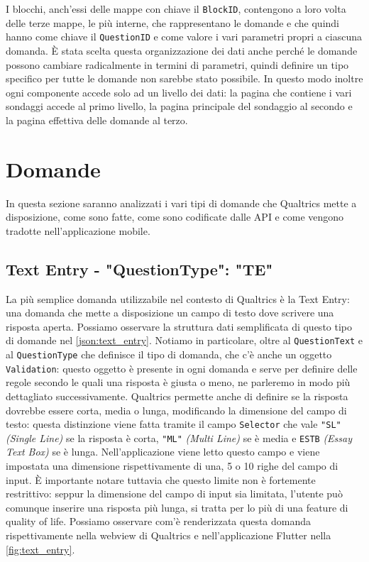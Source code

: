 I blocchi, anch'essi delle mappe con chiave il \texttt{BlockID}, contengono a loro volta delle terze mappe, le più interne, che rappresentano le domande e che quindi hanno come chiave il \texttt{QuestionID} e come valore i vari parametri propri a ciascuna domanda.
È stata scelta questa organizzazione dei dati anche perché le domande possono cambiare radicalmente in termini di parametri, quindi definire un tipo specifico per tutte le domande non sarebbe stato possibile. In questo modo inoltre ogni componente accede solo ad un livello dei dati: la pagina che contiene i vari sondaggi accede al primo livello, la pagina principale del sondaggio al secondo e la pagina effettiva delle domande al terzo.

\section{Domande}
In questa sezione saranno analizzati i vari tipi di domande che Qualtrics mette a disposizione, come sono fatte, come sono codificate dalle API e come vengono tradotte nell'applicazione mobile.

\subsection{Text Entry - "QuestionType": "TE"}
La più semplice domanda utilizzabile nel contesto di Qualtrics è la Text Entry: una domanda che mette a disposizione un campo di testo dove scrivere una risposta aperta.
Possiamo osservare la struttura dati semplificata di questo tipo di domande nel \autoref{json:text_entry}. Notiamo in particolare, oltre al \texttt{QuestionText} e al \texttt{QuestionType} che definisce il tipo di domanda, che c'è anche un oggetto \texttt{Validation}: questo oggetto è presente in ogni domanda e serve per definire delle regole secondo le quali una risposta è giusta o meno, ne parleremo in modo più dettagliato successivamente.
Qualtrics permette anche di definire se la risposta dovrebbe essere corta, media o lunga, modificando la dimensione del campo di testo: questa distinzione viene fatta tramite il campo \texttt{Selector} che vale \texttt{"SL"} \textit{(Single Line)} se la risposta è corta, \texttt{"ML"} \textit{(Multi Line)} se è media e \texttt{ESTB} \textit{(Essay Text Box)} se è lunga. Nell'applicazione viene letto questo campo e viene impostata una dimensione rispettivamente di una, 5 o 10 righe del campo di input. È importante notare tuttavia che questo limite non è fortemente restrittivo: seppur la dimensione del campo di input sia limitata, l'utente può comunque inserire una risposta più lunga, si tratta per lo più di una feature di quality of life. Possiamo osservare com'è renderizzata questa domanda rispettivamente nella webview di Qualtrics e nell'applicazione Flutter nella \autoref{fig:text_entry}.

